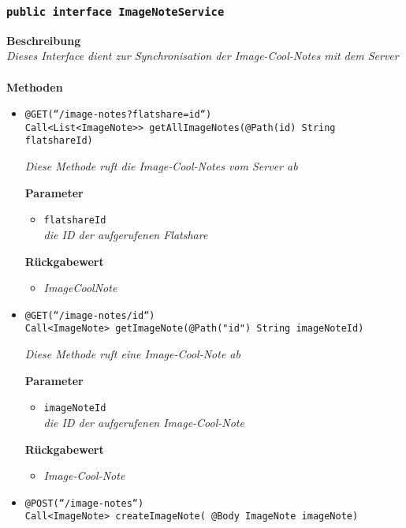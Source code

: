 	\subsubsection{\texttt{public interface ImageNoteService }}
	\textbf{Beschreibung}\\
	\textit{Dieses Interface dient zur Synchronisation der Image-Cool-Notes mit dem Server}\\
\\
	\textbf{Methoden} 
		\begin{itemize}
		\item\texttt{{@GET(``/image-notes?flatshare={id}``)\\
Call<List<ImageNote>> getAllImageNotes(@Path(\grqq id\grqq) String flatshareId)}}

		\textit{Diese Methode ruft die Image-Cool-Notes vom Server ab}

		\textbf{Parameter} 
			\begin{itemize}
				\item\texttt{flatshareId}\\
		 		\textit{die ID der aufgerufenen Flatshare}
	 		\end{itemize}

		\textbf{Rückgabewert} 
		\begin{itemize}
		\item\textit{ImageCoolNote}
		\end{itemize}
		
      \item\texttt{{@GET(``/image-notes/{id}``)\\ Call<ImageNote> getImageNote(@Path("\grqq id\grqq") String imageNoteId)}}

		\textit{Diese Methode ruft eine Image-Cool-Note ab }

		\textbf{Parameter} 
			\begin{itemize}
				\item\texttt{imageNoteId}\\
		 		\textit{die ID der aufgerufenen Image-Cool-Note}
	 		\end{itemize}

		\textbf{Rückgabewert} 
		\begin{itemize}
		\item\textit{Image-Cool-Note}
		\end{itemize}
		

	\item\texttt{{@POST(``/image-notes``)\\ Call<ImageNote> createImageNote( @Body ImageNote imageNote)}}


\end{itemize}
